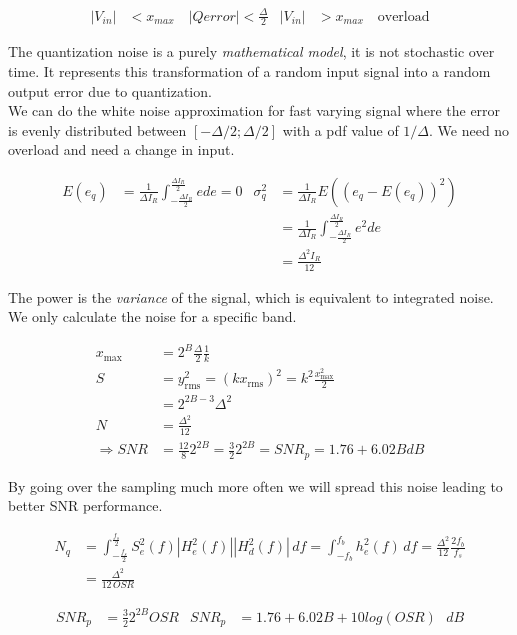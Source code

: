 \documentclass[
  a4paper,
]{article}
\begin{document}
\[\begin{aligned}
    |V_{in}| &< x_{max} \quad |Q error| < \frac{\Delta}{2} & |V_{in}| &> x_{max} \quad \text{overload}
\end{aligned}\]

The quantization noise is a purely \emph{mathematical model}, it is not
stochastic over time. It represents this transformation of a random
input signal into a random output error due to quantization.\\
We can do the white noise approximation for fast varying signal where
the error is evenly distributed between \([-\Delta/2;\Delta/2]\) with a
pdf value of \(1/\Delta\). We need no overload and need a change in
input.

\[\begin{aligned}
    E(e_q) &= \frac{1}{\Delta I_R} \int_{-\frac{\Delta I_R}{2}}^{\frac{\Delta I_R}{2}} e de = 0 & \sigma_q^2&= \frac{1}{\Delta I_R} E((e_q-E(e_q))^2)\\
    & & &=\frac{1}{\Delta I_R} \int_{-\frac{\Delta I_R}{2}}^{\frac{\Delta I_R}{2}} e^2 de\\
    & & &= \frac{\Delta^2 I_R}{12}
\end{aligned}\]

The power is the \emph{variance} of the signal, which is equivalent to
integrated noise. We only calculate the noise for a specific band.

\[\begin{aligned}
x_{\max} &= 2^B \frac{\Delta}{2} \frac{1}{k} \\ 
S &= y_{\text{rms}}^2 = (k x_{\text{rms}})^2 = k^2 \frac{x_{\max}^2}{2} \\ 
&= 2^{2B - 3} \Delta^2 \\ 
N &= \frac{\Delta^2}{12} \\ 
\Rightarrow SNR &= \frac{12}{8} 2^{2B} = \frac{3}{2} 2^{2B} = SNR_p = 1.76+6.02 B dB
\end{aligned}\]

By going over the sampling much more often we will spread this noise
leading to better SNR performance.

\[\begin{aligned}
N_q &= \int_{-\frac{f_s}{2}}^{\frac{f_s}{2}} S_e^2(f) |H_e^2(f)| |H_d^2(f)| \, df = \int_{-f_b}^{f_b} h_e^2(f) \, df = \frac{\Delta^2}{12} \frac{2 f_b}{f_s} \\
&= \frac{\Delta^2}{12 \, OSR}
\end{aligned}\]

\[\begin{aligned}
SNR_p &= \frac{3}{2} 2^{2B} OSR & SNR_p &= 1.76 + 6.02 B  + 10 log(OSR) \text{ } dB
\end{aligned}\]
\end{document}
